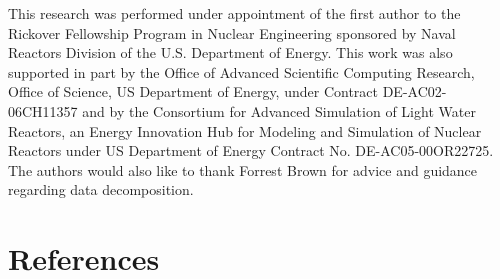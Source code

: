 \documentclass[3p,fleqn]{elsarticle}
\begin{document}
This research was performed under appointment of the first author to the
Rickover Fellowship Program in Nuclear Engineering sponsored by Naval Reactors
Division of the U.S. Department of Energy. This work was also supported in part
by the Office of Advanced Scientific Computing Research, Office of Science, US
Department of Energy, under Contract DE-AC02-06CH11357 and by the Consortium for
Advanced Simulation of Light Water Reactors, an Energy Innovation Hub for
Modeling and Simulation of Nuclear Reactors under US Department of Energy
Contract No. DE-AC05-00OR22725. The authors would also like to thank Forrest
Brown for advice and guidance regarding data decomposition.

\section*{References}



\end{document}
